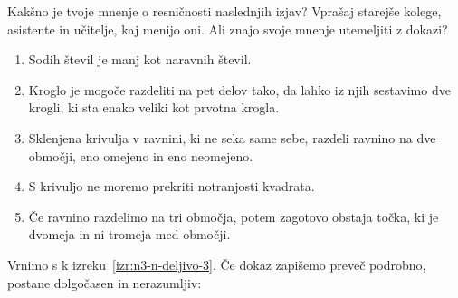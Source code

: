 \begin{naloga}
  Kakšno je tvoje mnenje o resničnosti naslednjih izjav? Vprašaj
  starejše kolege, asistente in učitelje, kaj menijo oni. Ali znajo
  svoje mnenje utemeljiti z dokazi?
  \begin{enumerate}
  \item Sodih števil je manj kot naravnih števil.
  \item Kroglo je mogoče razdeliti na pet delov tako, da lahko iz njih
    sestavimo dve krogli, ki sta enako veliki kot prvotna krogla.
  \item Sklenjena krivulja v ravnini, ki ne seka same sebe, razdeli
    ravnino na dve območji, eno omejeno in eno neomejeno.
  \item S krivuljo ne moremo prekriti notranjosti kvadrata.
  \item Če ravnino razdelimo na tri območja, potem zagotovo obstaja
    točka, ki je dvomeja in ni tromeja med območji.
  \end{enumerate}
\end{naloga}

\noindent
%
Vrnimo s k izreku~\ref{izr:n3-n-deljivo-3}. Če dokaz zapišemo preveč
podrobno, postane dolgočasen in ne\-ra\-zumljiv:

